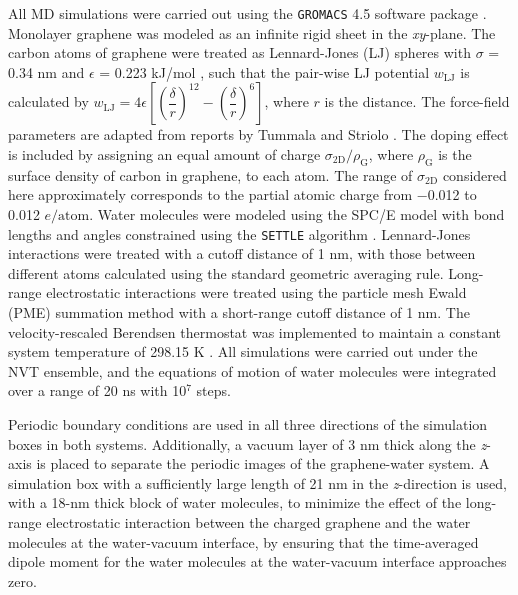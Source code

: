 All MD simulations were carried out
using the \texttt{GROMACS} 4.5 software package
\autocite{Hess_2008_gromacs}. Monolayer graphene was modeled as an
infinite rigid sheet in the \textit{xy}-plane.
%
The carbon atoms of graphene were treated as Lennard-Jones (LJ)
spheres with \(\sigma\) = 0.34 nm and \(\epsilon\) = 0.223 kJ/mol
\autocite{Cheng_1990}, such that the pair-wise LJ potential
$w_{\mathrm{LJ}}$ is calculated by
\(w_{\mathrm{LJ}} = 4
\epsilon\left[\left(\dfrac{\delta}{r}\right)^{12} -
  \left(\dfrac{\delta}{r}\right)^{6}\right]\), where $r$ is the
distance.  The force-field parameters are adapted from reports by
Tummala and Striolo \autocite{Tummala_2008_counterion_SDS}.
%
The doping effect is included by assigning an equal amount of charge
\(\sigma_{\mathrm{2D}} / \rho_{\mathrm{G}}\), where
\(\rho_{\mathrm{G}}\) is the surface density of carbon in graphene, to
each atom.
%
The range of \(\sigma_{\mathrm{2D}}\) considered here
approximately corresponds to the partial atomic charge from −0.012 to
0.012 \(e/\mathrm{atom}\).
%
Water molecules were modeled using the SPC/E model
\autocite{Berendsen_1987_pair} with bond lengths and angles constrained
using the \texttt{SETTLE} algorithm
\autocite{Miyamoto_1992_SHAKE_RATTLE}. Lennard-Jones interactions were
treated with a cutoff distance of 1 nm, with those between different
atoms calculated using the standard geometric averaging
rule. Long-range electrostatic interactions were treated using the
particle mesh Ewald (PME) summation method
\autocite{Darden_1993_ewald,Essmann_1995_ewald} with a short-range cutoff
distance of 1 nm. The velocity-rescaled Berendsen thermostat was
implemented to maintain a constant system temperature of 298.15 K
\autocite{Bussi_2007}. All simulations were carried out under the NVT
ensemble, and the equations of motion of water molecules were
integrated over a range of 20 ns with 10\(^{\text{7}}\) steps.

Periodic boundary conditions are used in all three directions of the
simulation boxes in both systems. Additionally, a vacuum layer of 3 nm
thick along the \emph{z}-axis is placed to separate the periodic
images of the graphene-water system. A simulation box with a
sufficiently large length of 21 nm in the \emph{z}-direction is used,
with a 18-nm thick block of water molecules, to minimize the effect of
the long-range electrostatic interaction between the charged graphene
and the water molecules at the water-vacuum interface, by ensuring
that the time-averaged dipole moment for the water molecules at the
water-vacuum interface approaches zero.




